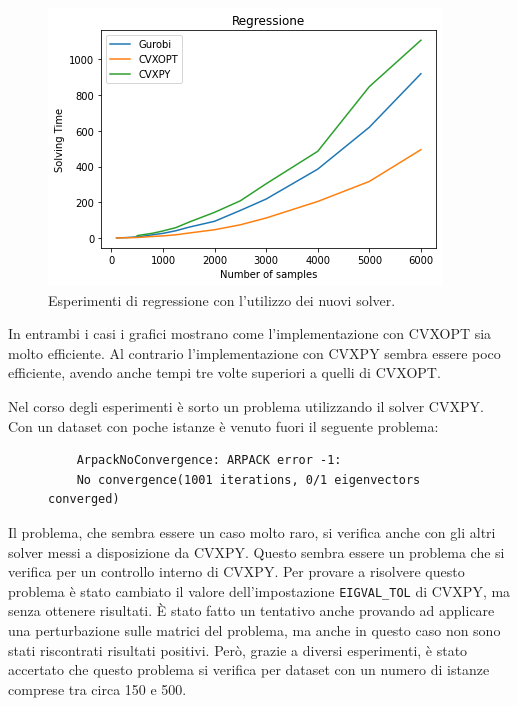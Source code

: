 \documentclass[a4paper,12pt]{report}
\begin{document}
\begin{figure}[H]
    \centering
    \includegraphics[scale=0.8]{images/Grafici/DifferentSolver_Regressione.png}
    \caption{Esperimenti di regressione con l'utilizzo dei nuovi solver.}
    \label{fig:differeSolver_Regressione}
\end{figure}

\noindent In entrambi i casi i grafici mostrano come l'implementazione con CVXOPT sia molto efficiente. Al contrario l'implementazione con CVXPY sembra essere poco efficiente, avendo anche tempi tre volte superiori a quelli di CVXOPT. 

\noindent Nel corso degli esperimenti è sorto un problema utilizzando il solver CVXPY. Con un dataset con poche istanze è venuto fuori il seguente problema:
\begin{figure}[H]
    \centering
    \begin{verbatim}
    ArpackNoConvergence: ARPACK error -1: 
    No convergence(1001 iterations, 0/1 eigenvectors converged)        
    \end{verbatim}
\end{figure}

\noindent Il problema, che sembra essere un caso molto raro, si verifica anche con gli altri solver messi a disposizione da CVXPY. Questo sembra essere un problema che si verifica per un controllo interno di CVXPY. Per provare a risolvere questo problema è stato cambiato il valore dell'impostazione \texttt{EIGVAL\_TOL} di CVXPY, ma senza ottenere risultati. \`E stato fatto un tentativo anche provando ad applicare una perturbazione sulle matrici del problema, ma anche in questo caso non sono stati riscontrati risultati positivi. Però, grazie a diversi esperimenti, è stato accertato che questo problema si verifica per dataset con un numero di istanze comprese tra circa 150 e 500.
\end{document}
